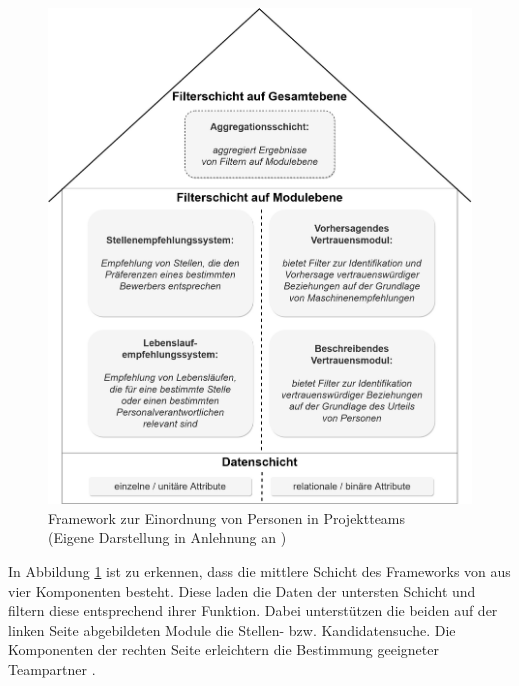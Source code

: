 \begin{figure}[h]
	\centering
	\includegraphics[width=1\textwidth]{gfx/keim-multilayer.jpg}
	\caption[Framework zur Einordnung von Personen in Projektteams]{Framework zur Einordnung von Personen in Projektteams\\
	(Eigene Darstellung in Anlehnung an \cite[S. 5]{keim:2007})}
	\label{fig:verwandteArbeiten:abb3}
\end{figure}

In Abbildung \ref{fig:verwandteArbeiten:abb3} ist zu erkennen, dass die mittlere Schicht des Frameworks von \textcite[S. 5ff.]{keim:2007} aus vier Komponenten besteht. Diese laden die Daten der untersten Schicht und filtern diese entsprechend ihrer Funktion. Dabei unterstützen die beiden auf der linken Seite abgebildeten Module die Stellen- bzw. Kandidatensuche. Die Komponenten der rechten Seite erleichtern die Bestimmung geeigneter Teampartner \cite[S. 5]{keim:2007}.

